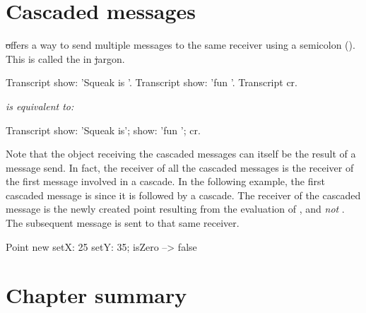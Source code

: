 \documentclass[a4paper,10pt,twoside]{book}
\begin{document}
\section{Cascaded messages}
\st offers a way to send multiple messages to the same receiver using a semicolon (\ct{;}).
This is called the  in \st jargon.


\begin{minipage}{0.35\textwidth}
\begin{code}{}
Transcript show: 'Squeak is '.
Transcript show: 'fun '.
Transcript cr.
\end{code}
\end{minipage}
\emph{is equivalent to:}
\begin{minipage}{0.35\textwidth}
\begin{code}{}
Transcript
   show: 'Squeak is';
   show: 'fun ';
   cr.
\end{code}
\end{minipage}

Note that the object receiving the cascaded messages can itself be the result of a message send.
In fact, the receiver of all the cascaded messages is the receiver of the first message involved in a cascade.
In the following example, the first cascaded message is  since it is followed by a cascade.
The receiver of the cascaded message  is the newly created point resulting from the evaluation of , and \emph{not} .
The subsequent message  is sent to that same receiver.

\begin{code}{}
Point new setX: 25 setY: 35; isZero --> false
\end{code}

\section{Chapter summary}
\end{document}
